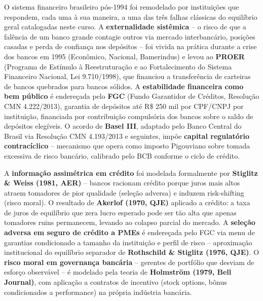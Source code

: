 \documentclass[11pt,addpoints]{exam}
\begin{document}
\begin{contextbox}
\small
O sistema financeiro brasileiro pós-1994 foi remodelado por instituições que respondem, cada uma à sua maneira, a uma das três falhas clássicas do equilíbrio geral catalogadas neste curso. A \textbf{externalidade sistêmica} -- o risco de que a falência de um banco grande contagie outros via mercado interbancário, posições casadas e perda de confiança nos depósitos -- foi vivida na prática durante a crise dos bancos em 1995 (Econômico, Nacional, Bamerindus) e levou ao \textbf{PROER} (Programa de Estímulo à Reestruturação e ao Fortalecimento do Sistema Financeiro Nacional, Lei 9.710/1998), que financiou a transferência de carteiras de bancos quebrados para bancos sólidos. A \textbf{estabilidade financeira como bem público} é endereçada pelo \textbf{FGC} (Fundo Garantidor de Créditos, Resolução CMN 4.222/2013), garantia de depósitos até R\$ 250 mil por CPF/CNPJ por instituição, financiada por contribuição compulsória dos bancos sobre o saldo de depósitos elegíveis. O acordo de \textbf{Basel III}, adaptado pelo Banco Central do Brasil via Resolução CMN 4.193/2013 e seguintes, impõe \textbf{capital regulatório contracíclico} -- mecanismo que opera como imposto Pigouviano sobre tomada excessiva de risco bancário, calibrado pelo BCB conforme o ciclo de crédito.

A \textbf{informação assimétrica em crédito} foi modelada formalmente por \textbf{Stiglitz \& Weiss (1981, AER)} -- bancos racionam crédito porque juros mais altos atraem tomadores de pior qualidade (seleção adversa) e induzem risk-shifting (risco moral). O resultado de \textbf{Akerlof (1970, QJE)} aplicado a crédito: a taxa de juros de equilíbrio que zera lucro esperado pode ser tão alta que apenas tomadores ruins permanecem, levando ao colapso parcial do mercado. A \textbf{seleção adversa em seguro de crédito a PMEs} é endereçada pelo FGC via menu de garantias condicionado a tamanho da instituição e perfil de risco -- aproximação institucional do equilíbrio separador de \textbf{Rothschild \& Stiglitz (1976, QJE)}. O \textbf{risco moral em governança bancária} -- gerentes de portfólio que desviam de esforço observável -- é modelado pela teoria de \textbf{Holmström (1979, Bell Journal)}, com aplicação a contratos de incentivo (stock options, bônus condicionados a performance) na própria indústria bancária.


\end{contextbox}
\end{document}
